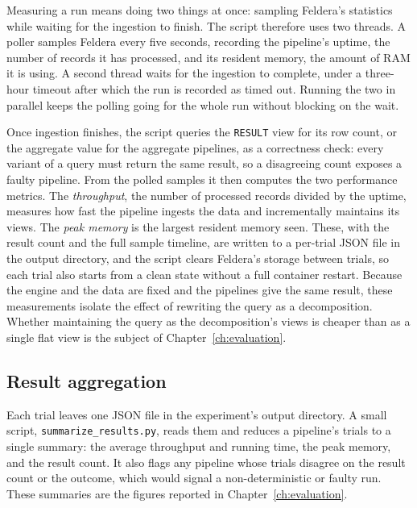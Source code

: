 Measuring a run means doing two things at once: sampling Feldera's statistics while waiting for the ingestion to finish.
The script therefore uses two threads.
A poller samples Feldera every five seconds, recording the pipeline's uptime, the number of records it has processed, and its resident memory, the amount of RAM it is using.
A second thread waits for the ingestion to complete, under a three-hour timeout after which the run is recorded as timed out.
Running the two in parallel keeps the polling going for the whole run without blocking on the wait.

Once ingestion finishes, the script queries the \texttt{RESULT} view for its row count, or the aggregate value for the aggregate pipelines, as a correctness check: every variant of a query must return the same result, so a disagreeing count exposes a faulty pipeline.
From the polled samples it then computes the two performance metrics.
The \emph{throughput}, the number of processed records divided by the uptime, measures how fast the pipeline ingests the data and incrementally maintains its views.
The \emph{peak memory} is the largest resident memory seen.
These, with the result count and the full sample timeline, are written to a per-trial JSON file in the output directory, and the script clears Feldera's storage between trials, so each trial also starts from a clean state without a full container restart.
Because the engine and the data are fixed and the pipelines give the same result, these measurements isolate the effect of rewriting the query as a decomposition.
Whether maintaining the query as the decomposition's views is cheaper than as a single flat view is the subject of Chapter~\ref{ch:evaluation}.

\subsection{Result aggregation}

Each trial leaves one JSON file in the experiment's output directory.
A small script, \texttt{summarize\_results.py}, reads them and reduces a pipeline's trials to a single summary: the average throughput and running time, the peak memory, and the result count.
It also flags any pipeline whose trials disagree on the result count or the outcome, which would signal a non-deterministic or faulty run.
These summaries are the figures reported in Chapter~\ref{ch:evaluation}.
